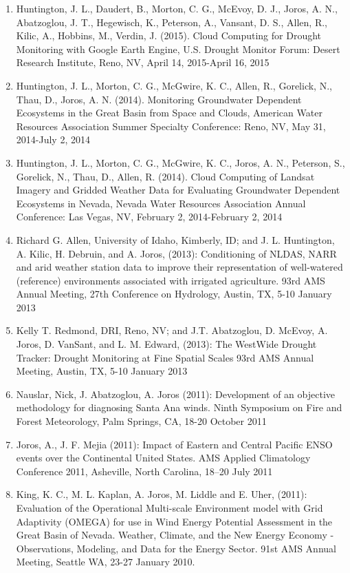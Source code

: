 \documentclass[letterpaper,11pt]{article}
\begin{document}
\begin{enumerate}[leftmargin=0.25in, label=\arabic*.]
    \item Huntington, J. L., Daudert, B., Morton, C. G., McEvoy, D. J., Joros, A. N., Abatzoglou, J. T., Hegewisch, K., Peterson, A., Vansant, D. S., Allen, R., Kilic, A., Hobbins, M., Verdin, J. (2015). Cloud Computing for Drought Monitoring with Google Earth Engine, U.S. Drought Monitor Forum: Desert Research Institute, Reno, NV, April 14, 2015-April 16, 2015
    \item Huntington, J. L., Morton, C. G., McGwire, K. C., Allen, R., Gorelick, N., Thau, D., Joros, A. N. (2014). Monitoring Groundwater Dependent Ecosystems in the Great Basin from Space and Clouds, American Water Resources Association Summer Specialty Conference: Reno, NV, May 31, 2014-July 2, 2014
    \item Huntington, J. L., Morton, C. G., McGwire, K. C., Joros, A. N., Peterson, S., Gorelick, N., Thau, D., Allen, R. (2014). Cloud Computing of Landsat Imagery and Gridded Weather Data for Evaluating Groundwater Dependent Ecosystems in Nevada, Nevada Water Resources Association Annual Conference: Las Vegas, NV, February 2, 2014-February 2, 2014
    \item Richard G. Allen, University of Idaho, Kimberly, ID; and J. L. Huntington, A. Kilic, H. Debruin, and A. Joros, (2013): Conditioning of NLDAS, NARR and arid weather station data to improve their representation of well-watered (reference) environments associated with irrigated agriculture. 93rd AMS Annual Meeting, 27th Conference on Hydrology, Austin, TX, 5-10 January 2013
    \item Kelly T. Redmond, DRI, Reno, NV; and J.T. Abatzoglou, D. McEvoy, A. Joros, D. VanSant, and L. M. Edward, (2013): The WestWide Drought Tracker: Drought Monitoring at Fine Spatial Scales 93rd AMS Annual Meeting, Austin, TX, 5-10 January 2013
    \item Nauslar, Nick, J. Abatzoglou, A. Joros (2011): Development of an objective methodology for diagnosing Santa Ana winds. Ninth Symposium on Fire and Forest Meteorology, Palm Springs, CA, 18-20 October 2011
    \item Joros, A., J. F. Mejia (2011): Impact of Eastern and Central Pacific ENSO events over the Continental United States. AMS Applied Climatology Conference 2011, Asheville, North Carolina, 18–20 July 2011
    \item King, K. C., M. L. Kaplan, A. Joros, M. Liddle and E. Uher, (2011): Evaluation of the Operational Multi-scale Environment model with Grid Adaptivity (OMEGA) for use in Wind Energy Potential Assessment in the Great Basin of Nevada. Weather, Climate, and the New Energy Economy - Observations, Modeling, and Data for the Energy Sector. 91st AMS Annual Meeting, Seattle WA, 23-27 January 2010.

\end{enumerate}
\end{document}
